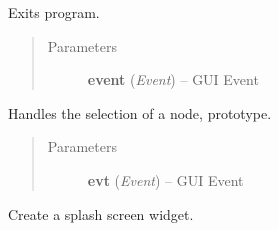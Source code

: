 \documentclass[letterpaper,10pt,english]{sphinxmanual}
\begin{document}
\begin{fulllineitems}
\begin{fulllineitems}
\end{fulllineitems}


\begin{fulllineitems}
\label{graphicaldesign:graphicaldesign.GUItemplate.OnExit}
Exits program.
\begin{quote}\begin{description}
\item[{Parameters}] \leavevmode
\textbf{event} (\emph{Event}) -- GUI Event

\end{description}\end{quote}

\end{fulllineitems}


\begin{fulllineitems}
\label{graphicaldesign:graphicaldesign.GUItemplate.SelectNode}
Handles the selection of a node, prototype.
\begin{quote}\begin{description}
\item[{Parameters}] \leavevmode
\textbf{evt} (\emph{Event}) -- GUI Event

\end{description}\end{quote}

\end{fulllineitems}


\end{fulllineitems}


\begin{fulllineitems}
\label{graphicaldesign:graphicaldesign.MySplashScreen}
Create a splash screen widget.

\end{fulllineitems}

\end{document}
